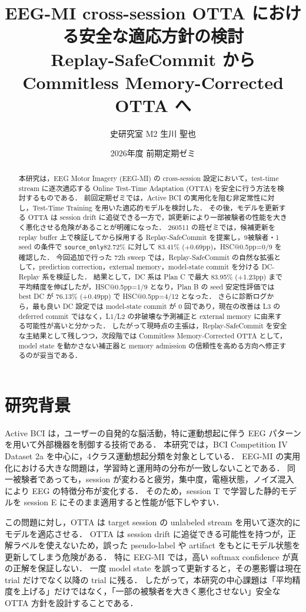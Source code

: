 \documentclass[a4paper,11pt]{ltjsarticle}
\title{EEG-MI cross-session OTTA における安全な適応方針の検討\\
\large Replay-SafeCommit から Commitless Memory-Corrected OTTA へ}
\author{史研究室 M2 \quad 生川 聖也}
\date{2026年度 前期定期ゼミ}
\makeatletter
\newcommand{\source}{\texttt{source\_only}}
\newcommand{\hsc}{HSC@0.5pp}
\makeatother
\begin{document}
\maketitle

\begin{abstract}
本研究は，EEG Motor Imagery (EEG-MI) の cross-session 設定において，test-time stream に逐次適応する Online Test-Time Adaptation (OTTA) を安全に行う方法を検討するものである．
前回定期ゼミでは，Active BCI の実用化を阻む非定常性に対し，Test-Time Training を用いた適応的モデルを検討した．
その後，モデルを更新する OTTA は session drift に追従できる一方で，誤更新により一部被験者の性能を大きく悪化させる危険があることが明確になった．
260511 の班ゼミでは，候補更新を replay buffer 上で検証してから採用する Replay-SafeCommit を提案し，9被験者・1 seed の条件で \source 82.72\% に対して 83.41\% (+0.69pp)，\hsc=0/9 を確認した．
今回追加で行った 72h sweep では，Replay-SafeCommit の自然な拡張として，prediction correction，external memory，model-state commit を分ける DC-Replay 系を検証した．
結果として，DC 系は Plan C で最大 83.95\% (+1.23pp) まで平均精度を伸ばしたが，\hsc=1/9 となり，Plan B の seed 安定性評価では best DC が 76.13\% (+0.49pp) で \hsc=4/12 となった．
さらに診断ログから，最も良い DC 設定では model-state commit が 0 回であり，現在の改善は L3 の deferred commit ではなく，L1/L2 の非破壊な予測補正と external memory に由来する可能性が高いと分かった．
したがって現時点の主張は，Replay-SafeCommit を安全な主結果として残しつつ，次段階では Commitless Memory-Corrected OTTA として，model state を動かさない補正器と memory admission の信頼性を高める方向へ修正するのが妥当である．
\end{abstract}

\section{研究背景}

Active BCI は，ユーザーの自発的な脳活動，特に運動想起に伴う EEG パターンを用いて外部機器を制御する技術である．
本研究では，BCI Competition IV Dataset 2a を中心に，4クラス運動想起分類を対象としている．
EEG-MI の実用化における大きな問題は，学習時と運用時の分布が一致しないことである．
同一被験者であっても，session が変わると疲労，集中度，電極状態，ノイズ混入により EEG の特徴分布が変化する．
そのため，session T で学習した静的モデルを session E にそのまま適用すると性能が低下しやすい．

この問題に対し，OTTA は target session の unlabeled stream を用いて逐次的にモデルを適応させる．
OTTA は session drift に追従できる可能性を持つが，正解ラベルを使えないため，誤った pseudo-label や artifact をもとにモデル状態を更新してしまう危険がある．
特に EEG-MI では，高い softmax confidence が真の正解を保証しない．
一度 model state を誤って更新すると，その悪影響は現在 trial だけでなく以降の trial に残る．
したがって，本研究の中心課題は「平均精度を上げる」だけではなく，「一部の被験者を大きく悪化させない」安全な OTTA 方針を設計することである．
\end{document}
